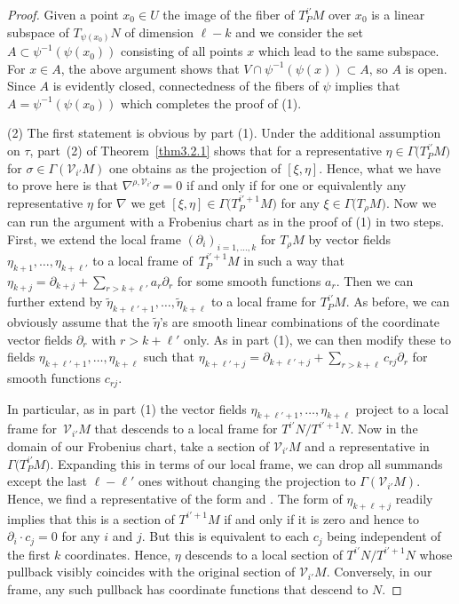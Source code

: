 \documentclass[pdftex]{sigma}
\numberwithin{equation}{section}
\def\Cal{\mathcal}
\newcommand{\si}{\sigma}
\newcommand{\Ga}{\Gamma}
\begin{document}
\begin{proof}
Given a point $x_0\in U$ the image of the fiber of $T^{i'}_PM$ over $x_0$ is a linear
subspace of $T_{\psi(x_0)}N$ of dimension $\ell-k$ and we consider the set
$A\subset \psi^{-1}(\psi(x_0))$ consisting of all points $x$ which lead to the same
subspace. For $x\in A$, the above argument shows that
$V\cap\psi^{-1}(\psi(x))\subset A$, so $A$ is open. Since $A$ is evidently closed,
connectedness of the fibers of $\psi$ implies that $A=\psi^{-1}(\psi(x_0))$ which
completes the proof of (1).



(2) The first statement is obvious by part (1). Under the additional assumption on
$\tau$, part~(2) of Theorem~\ref{thm3.2.1} shows that for a representative
$\eta\in\Ga\bigl(T^{i'}_PM\bigr)$ for $\si\in\Ga(\Cal V_{i'}M)$ one obtains \smash{$\nabla^{\rho,\Cal
 V_{i'}}_\xi\si$} as the projection of $[\xi,\eta]$. Hence, what we have to prove here
is that $\nabla^{\rho,\Cal V_{i'}}\si=0$ if and only if for one or equivalently any
representative $\eta$ for $\nabla$ we get $[\xi,\eta]\in\Ga\bigl(T^{i'+1}_PM\bigr)$ for any
$\xi\in\Ga\bigl(T_\rho M\bigr)$. Now we can run the argument with a Frobenius chart as in the
proof of (1) in two steps. First, we extend the local frame
$(\partial_i)_{i=1,\dots,k}$ for $T_\rho M$ by vector fields
$\eta_{k+1},\dots,\eta_{k+\ell'}$ to a local frame of~$T^{i'+1}_P M$ in such a way
that $\eta_{k+j}=\partial_{k+j}+\sum_{r>k+\ell'}a_r\partial_r$ for some smooth
functions $a_r$. Then we can further extend by
$\tilde\eta_{k+\ell'+1},\dots,\tilde\eta_{k+\ell}$ to a local frame for
$T^{i'}_PM$. As before, we can obviously assume that the $\tilde\eta$'s are smooth
linear combinations of the coordinate vector fields $\partial_r$ with $r>k+\ell'$
only. As in part (1), we can then modify these to fields
$\eta_{k+\ell'+1},\dots,\eta_{k+\ell}$ such that
$\eta_{k+\ell'+j}=\partial_{k+\ell'+j}+\sum_{r>k+\ell}c_{rj}\partial_r$ for smooth
functions $c_{rj}$.

In particular, as in part (1) the vector fields
$\eta_{k+\ell'+1},\dots,\eta_{k+\ell}$ project to a local frame for~$\Cal V_{i'}M$
that descends to a local frame for $T^{i'}N/T^{i'+1}N$. Now in the domain of our
Frobenius chart, take a section of $\Cal V_{i'}M$ and a representative in
$\Ga\bigl(T^{i'}_PM\bigr)$. Expanding this in terms of our local frame, we can drop all
summands except the last $\ell-\ell'$ ones without changing the projection to
$\Ga(\Cal V_{i'}M)$. Hence, we find a representative of the form
 and
. The
form of $\eta_{k+\ell+j}$ readily implies that this is a section of $T^{i'+1}M$ if
and only if it is zero and hence to $\partial_i\cdot c_j=0$ for any $i$ and $j$. But
this is equivalent to each $c_j$ being independent of the first $k$
coordinates. Hence, $\eta$ descends to a local section of $T^{i'}N/T^{i'+1}N$ whose
pullback visibly coincides with the original section of $\Cal V_{i'}M$. Conversely,
in our frame, any such pullback has coordinate functions that descend to $N$.
\end{proof}
\end{document}

